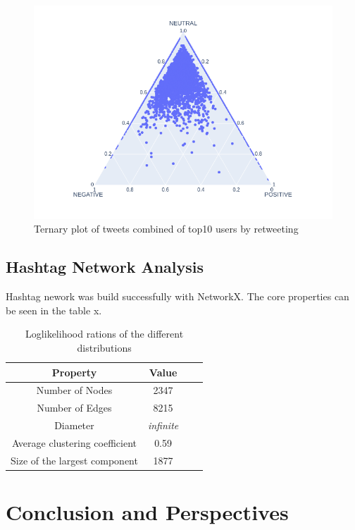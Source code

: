 \documentclass[conference]{IEEEtran}
\begin{document}
\begin{figure}
\includegraphics[scale=0.4]{figures/sentiment_ternary_all}
\caption{Ternary plot of tweets combined of top10 users by retweeting }
\label{fig:sentiment-ternary-user-retweet}
\end{figure}

\subsection{Hashtag Network Analysis}

Hashtag nework was build successfully with NetworkX.
The core properties can be seen in the table x.

\begin{table}
    \begin{tabular}{ |c|c|c|c|}
        \hline
        Property & Value \\
        \hline
        Number of Nodes & 2347 \\
        \hline
        Number of Edges & 8215 \\
        \hline
        Diameter & \textit{infinite} \\
        \hline
        Average clustering coefficient & 0.59 \\
        \hline
        Size of the largest component & 1877 \\
        \hline
    \end{tabular}
    \caption{Loglikelihood rations of the different distributions}
    \label{tab:powerlaw}
\end{table}
\section{Conclusion and Perspectives}\label{sec:conclusion-and-perspectives}
\end{document}
